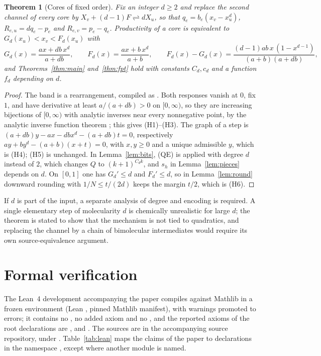 \documentclass[11pt,a4paper]{article}
\makeatletter
\newcommand{\PaperRepository}{}
\theoremstyle{plain}
\newtheorem{theorem}{Theorem}[section]
\theoremstyle{definition}
\theoremstyle{remark}
\newcommand{\rev}{\rightleftharpoons}
\newcommand{\RepoPhrase}{\ifx\PaperRepository\@empty the accompanying source repository\else\url{\PaperRepository}\fi}
\makeatother
\begin{document}
\begin{theorem}[Cores of fixed order]\label{thm:degree}
Fix an integer $d\ge2$ and replace the second channel of every core by $X_v+(d-1)F\rev dX_u$, so that $q_e=b_e(x_v-x_u^d)$, $R_{e,u}=dq_e-p_e$ and $R_{e,v}=p_e-q_e$. Productivity of a core is equivalent to $G_d(x_u)<x_v<F_d(x_u)$ with
\[
   G_d(x)=\frac{ax+db\,x^d}{a+db},\qquad F_d(x)=\frac{ax+b\,x^d}{a+b},\qquad F_d(x)-G_d(x)=\frac{(d-1)ab\,x\,(1-x^{d-1})}{(a+b)(a+db)},
\]
and Theorems~\ref{thm:main} and~\ref{thm:fpt} hold with constants $C_d,c_d$ and a function $f_d$ depending on $d$.
\end{theorem}
\begin{proof}
The band is a rearrangement, compiled as . Both responses vanish at $0$, fix $1$, and have derivative at least $a/(a+db)>0$ on $[0,\infty)$, so they are increasing bijections of $[0,\infty)$ with analytic inverses near every nonnegative point, by the analytic inverse function theorem \citep{krantz2002}; this gives (H1)--(H3). The graph of a step is $(a+db)y-ax-dbx^d-(a+db)t=0$, respectively $ay+by^d-(a+b)(x+t)=0$, with $x,y\ge0$ and a unique admissible $y$, which is (H4); (H5) is unchanged. In Lemma~\ref{lem:bits}, (QE) is applied with degree $d$ instead of $2$, which changes $Q$ to $(k+1)^{C_dk}$, and $s_h$ in Lemma~\ref{lem:pieces} depends on $d$. On $[0,1]$ one has $G_d'\le d$ and $F_d'\le d$, so in Lemma~\ref{lem:round} downward rounding with $1/N\le t/(2d)$ keeps the margin $t/2$, which is (H6).
\end{proof}

If $d$ is part of the input, a separate analysis of degree and encoding is required. A single elementary step of molecularity $d$ is chemically unrealistic for large $d$; the theorem is stated to show that the mechanism is not tied to quadratics, and replacing the channel by a chain of bimolecular intermediates would require its own source-equivalence argument.

\section{Formal verification}\label{sec:formal}

The Lean~4 development accompanying the paper compiles against Mathlib in a frozen environment (Lean , pinned Mathlib manifest), with warnings promoted to errors; it contains no , no added axiom and no , and the reported axioms of the root declarations are ,  and . The sources are in \RepoPhrase, under . Table~\ref{tab:lean} maps the claims of the paper to declarations in the namespace , except where another module is named.
\end{document}

